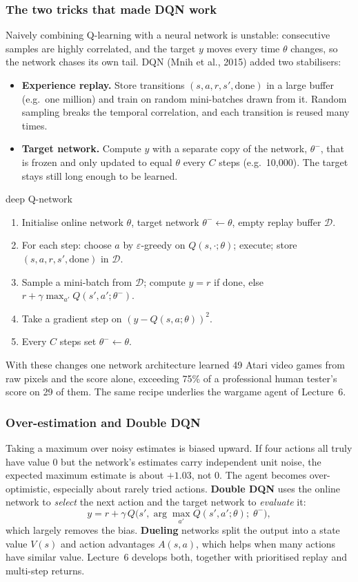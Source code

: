 \documentclass[11pt]{article}
\begin{document}
\subsubsection{The two tricks that made DQN work}
Naively combining Q-learning with a neural network is unstable: consecutive samples are highly correlated, and the target $y$ moves every time $\theta$ changes, so the network chases its own tail. DQN (Mnih et al., 2015) added two stabilisers:
\begin{itemize}
\item \textbf{Experience replay.} Store transitions $(s,a,r,s',\text{done})$ in a large buffer (e.g.\ one million) and train on random mini-batches drawn from it. Random sampling breaks the temporal correlation, and each transition is reused many times.
\item \textbf{Target network.} Compute $y$ with a separate copy of the network, $\theta^-$, that is frozen and only updated to equal $\theta$ every $C$ steps (e.g.\ 10,000). The target stays still long enough to be learned.
\end{itemize}
\begin{algo}{deep Q-network}
\begin{enumerate}[leftmargin=1.5em]
\item Initialise online network $\theta$, target network $\theta^-\leftarrow\theta$, empty replay buffer $\mathcal D$.
\item For each step: choose $a$ by $\varepsilon$-greedy on $Q(s,\cdot;\theta)$; execute; store $(s,a,r,s',\text{done})$ in $\mathcal D$.
\item Sample a mini-batch from $\mathcal D$; compute $y=r$ if done, else $r+\gamma\max_{a'}Q(s',a';\theta^-)$.
\item Take a gradient step on $(y-Q(s,a;\theta))^2$.
\item Every $C$ steps set $\theta^-\leftarrow\theta$.
\end{enumerate}
\end{algo}
With these changes one network architecture learned 49 Atari video games from raw pixels and the score alone, exceeding 75\% of a professional human tester's score on 29 of them. The same recipe underlies the wargame agent of Lecture~6.

\subsubsection{Over-estimation and Double DQN}
Taking a maximum over noisy estimates is biased upward. If four actions all truly have value 0 but the network's estimates carry independent unit noise, the expected maximum estimate is about $+1.03$, not 0. The agent becomes over-optimistic, especially about rarely tried actions. \textbf{Double DQN} uses the online network to \emph{select} the next action and the target network to \emph{evaluate} it:
\[y=r+\gamma\,Q\big(s',\arg\max_{a'}Q(s',a';\theta);\;\theta^-\big),\]
which largely removes the bias. \textbf{Dueling} networks split the output into a state value $V(s)$ and action advantages $A(s,a)$, which helps when many actions have similar value. Lecture~6 develops both, together with prioritised replay and multi-step returns.
\end{document}
